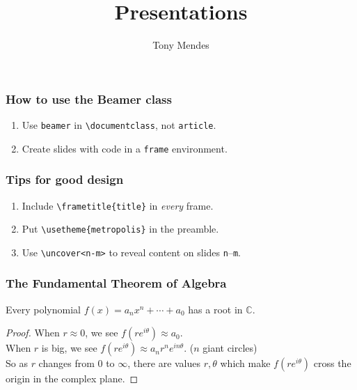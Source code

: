 \documentclass{beamer}
\title{Presentations}
\author{Tony Mendes}
\institute{Cal Poly San Luis Obispo}
\date{}
\begin{document}
\begin{frame}
\titlepage
\end{frame}


\begin{frame}[fragile] %

  \frametitle{How to use the Beamer class}
  
  \begin{enumerate}
      \item Use \verb~beamer~ in \verb~\documentclass~, not \verb~article~. \\[5ex]
      \item Create slides with code in a \verb~frame~ environment. 
  \end{enumerate}

\end{frame}


\begin{frame}[fragile]
\frametitle{Tips for good design}

\begin{enumerate}
\item Include \verb~\frametitle{title}~ in \emph{every} frame. \\[3ex]
\item Put \verb~\usetheme{metropolis}~ in the preamble. \\[3ex]
\item Use \verb~\uncover<n-m>~ to reveal content on slides \verb~n~--\verb~m~. \\[3ex]
   
\end{enumerate}

\end{frame}


\begin{frame}
\frametitle{The Fundamental Theorem of Algebra}
  
\begin{theorem}
  Every polynomial $f(x) = a_n x^n + \cdots + a_0$ has a root in $\mathbb{C}$.
\end{theorem}

\vfill

\begin{proof}
  When $r \approx 0$, we see \( f(r e^{i \theta}) \approx a_0 \).  \\[3ex]
  
  When $r$ is big, we see $f(r e^{i \theta}) \approx a_n r^n e^{i n \theta}$.
  \hfill ($n$ giant circles) \\[3ex]

  So as $r$ changes from $0$ to $\infty$, there are values $r, \theta$ which make
  $f(r e^{i \theta})$ cross the origin in the complex plane.
  \end{proof}
\end{frame}
\end{document}
